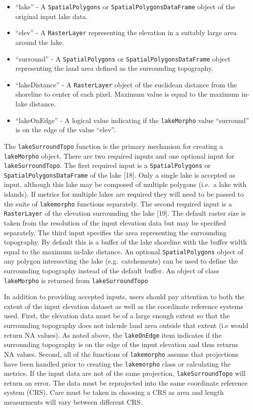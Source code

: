 \documentclass[11pt,]{article}
\providecommand{\tightlist}{%
  \setlength{\itemsep}{0pt}\setlength{\parskip}{0pt}}
\begin{document}
\begin{itemize}
\tightlist
\item
  ``lake'' - A \texttt{SpatialPolygons} or
  \texttt{SpatialPolygonsDataFrame} object of the original input lake
  data.
\item
  ``elev'' - A \texttt{RasterLayer} representing the elevation in a
  suitably large area around the lake.
\item
  ``surround'' - A \texttt{SpatialPolygons} or
  \texttt{SpatialPolygonsDataFrame} object representing the land area
  defined as the surrounding topography.
\item
  ``lakeDistance'' - A \texttt{RasterLayer} object of the euclidean
  distance from the shoreline to center of each pixel. Maximum value is
  equal to the maximum in-lake distance.
\item
  ``lakeOnEdge'' - A logical value indicating if the \texttt{lakeMorpho}
  value ``surround'' is on the edge of the value ``elev''.
\end{itemize}

The \texttt{lakeSurroundTopo} function is the primary mechanism for
creating a \texttt{lakeMorpho} object. There are two required inputs and
one optional input for \texttt{lakeSurroundTopo}. The first required
input is a \texttt{SpatialPolygons} or \texttt{SpatialPolygonsDataFrame}
of the lake {[}18{]}. Only a single lake is accepted as input, although
this lake may be composed of multiple polygons (i.e.~a lake with
islands). If metrics for multiple lakes are required they will need to
be passed to the suite of \texttt{lakemorpho} functions separately. The
second required input is a \texttt{RasterLayer} of the elevation
surrounding the lake {[}19{]}. The default raster size is taken from the
resolution of the input elevation data but may be specified separately.
The third input specifies the area representing the surrounding
topography. By default this is a buffer of the lake shoreline with the
buffer width equal to the maximum in-lake distance. An optional
\texttt{SpatialPolygons} object of any polygon intersecting the lake
(e.g.~catchements) can be used to define the surrounding topography
instead of the default buffer. An object of class \texttt{lakeMorpho} is
returned from \texttt{lakeSurroundTopo}

In addition to providing accepted inputs, users should pay attention to
both the extent of the input elevation dataset as well as the coordinate
reference systems used. First, the elevation data must be of a large
enough extent so that the surrounding topography does not inlcude land
area outside that extent (i.e would return NA values). As noted above,
the \texttt{lakeOnEdge} item indicates if the surrounding topography is
on the edge of the input elevation and thus returns NA values. Second,
all of the functions of \texttt{lakemorpho} assume that projections have
been handled prior to creating the \texttt{lakemorpho} class or
calculating the metrics. If the input data are not of the same
projection, \texttt{lakeSurroundTopo} will return an error. The data
must be reprojected into the same coordinate reference system (CRS).
Care must be taken in choosing a CRS as area and length measurments will
vary between different CRS.
\end{document}
